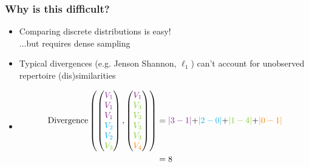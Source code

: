 \documentclass[mathserif,compress,xcolor={dvipsnames}]{beamer}
\newcommand*\ba{\[ \begin{aligned}}
\newcommand*\ea{\end{aligned} \]}
\renewcommand\;{\,}
\begin{document}
\begin{frame}\frametitle{Why is this difficult?}
\begin{itemize}
\item
Comparing discrete distributions is easy! \\ ...but requires dense sampling
\bigskip
\item
Typical divergences (e.g. Jenson Shannon, $\ell_1$) can't account for unobserved repertoire (dis)similarities
\item[]
\ba
\text{Divergence}
	\left(\begin{pmatrix} \color{Purple} V_1 \\ \color{Fuchsia} V_1 \\ \color{Fuchsia} V_1 \\ \color{ProcessBlue} V_2 \\ \color{ProcessBlue} V_2 \\ \color{LimeGreen} V_3 \end{pmatrix},
		  \begin{pmatrix} \color{Fuchsia} V_1 \\ \color{LimeGreen} V_3 \\ \color{LimeGreen} V_3 \\ \color{LimeGreen} V_3 \\ \color{LimeGreen} V_3 \\ \color{orange} V_4 \end{pmatrix}
	\right)
	& = \color{Fuchsia}{|3 - 1|} \color{black}{+} \color{ProcessBlue}{|2 - 0|} \color{black}{+} \color{LimeGreen}{|1 - 4|} \color{black}{+} \color{orange}{|0 - 1|} \\
	& = 8
\ea
\end{itemize}
\end{frame}
\end{document}
